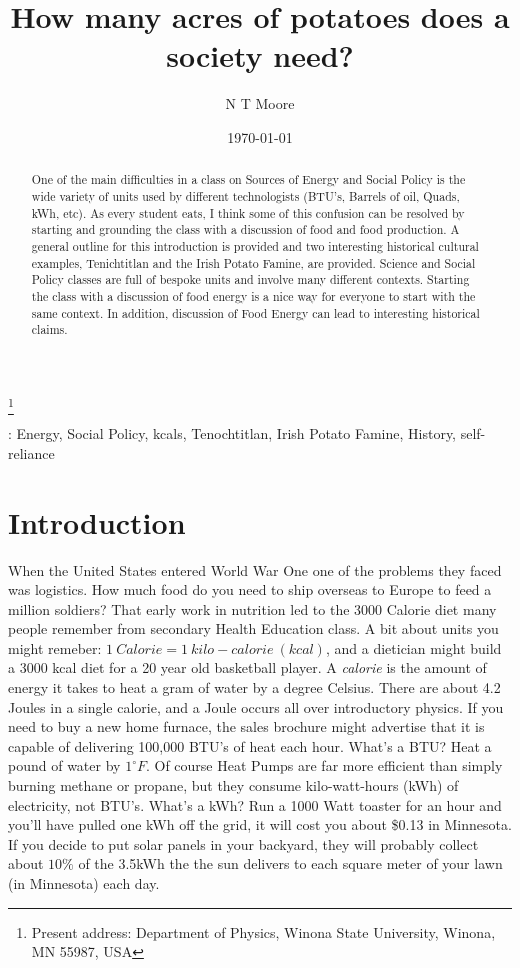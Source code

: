 \documentclass[12pt]{iopart}
\begin{document}
\title[How many acres of potatoes does a society need?]{How many acres of potatoes does a society need?}
\author{N T Moore}
\footnote{Present address:
Department of Physics, Winona State University, Winona, MN 55987, USA}
\date{\today}
\begin{abstract}
One of the main difficulties in a class on Sources of Energy and Social Policy is the wide variety of units used by different technologists (BTU's, Barrels of oil, Quads, kWh, etc).  As every student eats, I think some of this confusion can be resolved by starting and grounding the class with a discussion of food and food production.  A general outline for this introduction is provided and two interesting historical cultural examples, Tenichtitlan and the Irish Potato Famine, are provided.  
Science and Social Policy classes are full of bespoke units and involve many different contexts.  Starting the class with a discussion of food energy is a nice way for everyone to start with the same context.  In addition, discussion of Food Energy can lead to interesting historical claims. 
\end{abstract}
: Energy, Social Policy, kcals, Tenochtitlan, Irish Potato Famine, History, self-reliance
\submitto{\PED}
\maketitle

\section{Introduction}
When the United States entered World War One one of the problems they faced was logistics.  How much food do you need to ship overseas to Europe to feed a million soldiers?  That early work in nutrition led to the 3000 Calorie diet many people remember from secondary Health Education class.  A bit about units you might remeber: $1~Calorie = 1~kilo-calorie~(kcal)$, and a dietician might build a 3000 kcal diet for a 20 year old basketball player.  A \textit{calorie} is the amount of energy it takes  to heat a gram of water by a degree Celsius.  There are about 4.2 Joules in a single calorie, and a Joule occurs all over introductory  physics.  If you need to buy a new home furnace, the sales brochure might advertise that it is capable of delivering 100,000 BTU's of heat each hour.  What's a BTU? Heat a pound of water by $1^{\circ}F$.  Of course Heat Pumps are far more efficient than simply burning methane or propane, but they consume kilo-watt-hours (kWh) of electricity, not BTU's.  What's a kWh?  Run a 1000 Watt toaster for an hour and you'll have pulled one kWh off the grid, it will cost you about \$0.13 in Minnesota.  If you decide to put solar panels in your backyard, they will probably collect about $10\%$ of the 3.5kWh the  the sun delivers to each square meter of your lawn (in Minnesota) each day.  
\end{document}
